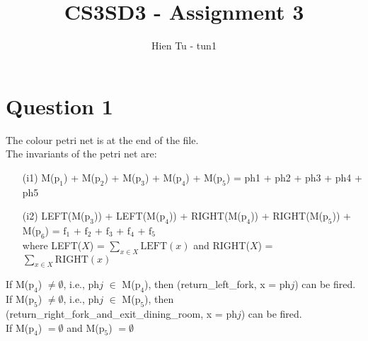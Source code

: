 \documentclass{article}
\title{CS3SD3 - Assignment 3}
\author{Hien Tu - tun1}
\begin{document}
\maketitle

\section*{Question 1}

The colour petri net is at the end of the file. \\
The invariants of the petri net are:
\begin{enumerate}
  \item[(i1)] M($\text{p}_1$) + M($\text{p}_2$) + M($\text{p}_3$) +
              M($\text{p}_4$) + M($\text{p}_5$) = ph1 + ph2 + ph3 + ph4 + ph5
  \item[(i2)] LEFT(M($\text{p}_3$)) + LEFT(M($\text{p}_4$)) +
              RIGHT(M($\text{p}_4$)) + RIGHT(M($\text{p}_5$)) + M($\text{p}_6$)
              = $\text{f}_1$ + $\text{f}_2$ + $\text{f}_3$ + $\text{f}_4$ +
              $\text{f}_5$ \\
              where LEFT($X$) = $\sum_{x \in X} \text{LEFT}(x)$ and
                    RIGHT($X$) = $\sum_{x \in X} \text{RIGHT}(x)$
\end{enumerate}
If M($\text{p}_4$) $\neq \emptyset$, i.e., ph$j$ $\in$ M($\text{p}_4$), then
(return\_left\_fork, x = ph$j$) can be fired. \\
If M($\text{p}_5$) $\neq \emptyset$, i.e., ph$j$ $\in$ M($\text{p}_5$), then
(return\_right\_fork\_and\_exit\_dining\_room, x = ph$j$) can be fired. \\
If M($\text{p}_4$) $= \emptyset$ and M($\text{p}_5$) $= \emptyset$
\end{document}

